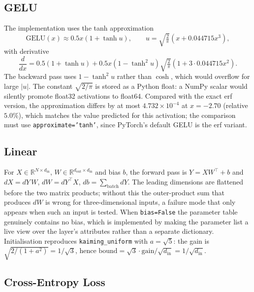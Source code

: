 \documentclass[10pt]{article}
\begin{document}
\subsection{GELU}

The implementation uses the tanh approximation
\begin{equation}
\mathrm{GELU}(x) \approx 0.5x\left(1+\tanh u\right), \qquad
u = \sqrt{\tfrac{2}{\pi}}\left(x + 0.044715x^3\right),
\end{equation}
with derivative
\begin{equation}
\frac{d}{dx} = 0.5(1+\tanh u) + 0.5x\left(1-\tanh^2 u\right)\sqrt{\tfrac{2}{\pi}}\left(1+3\cdot0.044715x^2\right).
\end{equation}
The backward pass uses $1-\tanh^2 u$ rather than $\cosh$, which would overflow for large $\lvert u\rvert$.
The constant $\sqrt{2/\pi}$ is stored as a Python float: a NumPy scalar would silently promote
float32 activations to float64. Compared with the exact erf version, the approximation differs by at
most $4.732\times10^{-4}$ at $x=-2.70$ (relative $5.0\%$), which matches the value predicted for this
activation; the comparison must use \texttt{approximate='tanh'}, since PyTorch's default GELU is the
erf variant.

\subsection{Linear}

For $X\in\mathbb{R}^{N\times d_{\text{in}}}$, $W\in\mathbb{R}^{d_{\text{out}}\times d_{\text{in}}}$
and bias $b$, the forward pass is $Y=XW^{\top}+b$ and
$dX=dY\,W$, $dW=dY^{\top}X$, $db=\sum_{\text{batch}}dY$. The leading dimensions are flattened before
the two matrix products; without this the outer-product sum that produces $dW$ is wrong for
three-dimensional inputs, a failure mode that only appears when such an input is tested. When
\texttt{bias=False} the parameter table genuinely contains no bias, which is implemented by making
the parameter list a live view over the layer's attributes rather than a separate dictionary.
Initialisation reproduces \texttt{kaiming\_uniform} with $a=\sqrt5$: the gain is
$\sqrt{2/(1+a^2)}=1/\sqrt3$, hence $\mathrm{bound}=\sqrt3\cdot\mathrm{gain}/\sqrt{d_{\text{in}}}=1/\sqrt{d_{\text{in}}}$.

\subsection{Cross-Entropy Loss}
\end{document}
